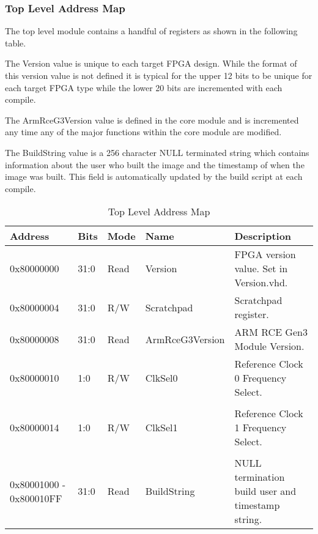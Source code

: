 \documentclass[11pt]{article}
\begin{document}
\subsubsection{Top Level Address Map}

The top level module contains a handful of registers as shown in the following table. 

The Version value is unique to each target FPGA design. While the format of this version value is not defined it is typical for the upper 
12 bits to be unique for each target FPGA type while the lower 20 bits are incremented with each compile.

The ArmRceG3Version value is defined in the core module and is incremented any time any of the major functions within the core module are
modified.

The BuildString value is a 256 character NULL terminated string which contains information about the user who built the image and the 
timestamp of when the image was built. This field is automatically updated by the build script at each compile.

\begin{table}[H]
\small
\centering
   \begin{tabular}{| l | l | l | l | l | } 
      \hline \textbf{Address} & \textbf{Bits} & \textbf{Mode} & \textbf{Name} & \textbf{Description} \\
      \hline 0x80000000       & 31:0          & Read     & Version         & FPGA version value. Set in Version.vhd. \\
      \hline 0x80000004       & 31:0          & R/W      & Scratchpad      & Scratchpad register.                                 \\
      \hline 0x80000008       & 31:0          & Read     & ArmRceG3Version & ARM RCE Gen3 Module Version.                         \\
      \hline 0x80000010       & 1:0           & R/W      & ClkSel0         & Reference Clock 0 Frequency Select. \\               \\
      \hline 0x80000014       & 1:0           & R/W      & ClkSel1         & Reference Clock 1 Frequency Select. \\               \\
      \hline 0x80001000 - 0x800010FF & 31:0   & Read     & BuildString     & NULL termination build user and timestamp string.    \\
      \hline
   \end{tabular}
   \caption{Top Level Address Map}
   \label{tab:top_addr}
\end{table}
\end{document}
